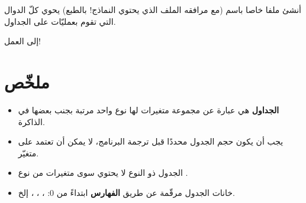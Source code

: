 \begin{information}
أنشئ ملفا خاصا باسم
(مع مرافقه الملف
الذي يحتوي النماذج! بالطبع) يحوي كلّ الدوال التي تقوم بعمليّات على الجداول.
\end{information}

إلى العمل!

\section*{ملخّص}

\begin{itemize}
  \item \textbf{الجداول}
هي عبارة عن مجموعة متغيرات لها نوع واحد مرتبة بجنب بعضها في الذاكرة.
  \item يجب أن يكون حجم الجدول محددًا قبل ترجمة البرنامج، لا يمكن أن تعتمد على متغيّر.
  \item الجدول ذو النوع
لا يحتوي سوى متغيرات من نوع
.
  \item خانات الجدول مرقّمة عن طريق
\textbf{الفهارس}
ابتداءً من 0:
، ، ،
إلخ.
\end{itemize}
